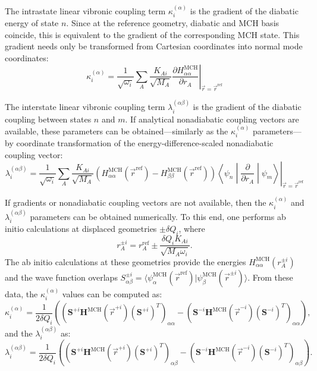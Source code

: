 \documentclass[a4paper,10pt,DIV=15,openany]{scrbook}
\begin{document}
The intrastate linear vibronic coupling term $\kappa_i^{(\alpha)}$ is the gradient of the diabatic energy of state $n$.
Since at the reference geometry, diabatic and MCH basis coincide, this is equivalent to the gradient of the corresponding MCH state.
This gradient needs only be transformed from Cartesian coordinates into normal mode coordinates:
\begin{equation}
  \kappa_i^{(\alpha)} = \frac{1}{\sqrt{\omega_i}}\sum_A \frac{K_{A i}}{\sqrt{M_A}} \left.\frac{\partial H^\text{MCH}_{\alpha\alpha}}{\partial r_A}\right|_{\vec{r}=\vec{r}^\text{ref}}
\end{equation}

The interstate linear vibronic coupling term $\lambda_i^{(\alpha\beta)}$ is the gradient of the diabatic coupling between states $n$ and $m$.
If analytical nonadiabatic coupling vectors are available, these parameters can be obtained---similarly as the $\kappa_i^{(\alpha)}$ parameters---by coordinate transformation of the energy-difference-scaled nonadiabatic coupling vector:
\begin{equation}
  \lambda_i^{(\alpha\beta)}
  =
  \frac{1}{\sqrt{\omega_i}}\sum_A \frac{K_{A i}}{\sqrt{M_A}} 
  \left(H^\text{MCH}_{\alpha\alpha}(\vec{r}^\text{ref})-H^\text{MCH}_{\beta\beta}(\vec{r}^\text{ref})\right)
  \left.
    \left\langle
      \psi_n\middle|\frac{\partial}{\partial r_A}\middle|\psi_m
    \right\rangle
  \right|_{\vec{r}=\vec{r}^\text{ref}}
\end{equation}

If gradients or nonadiabatic coupling vectors are not available, then the $\kappa_i^{(\alpha)}$ and  $\lambda_i^{(\alpha\beta)}$ parameters can be obtained numerically.
To this end, one performs ab initio calculations at displaced geometries $\pm\delta Q_i$, where
\begin{equation}
  r_A^{\pm i}=r_A^\text{ref} \pm \frac{\delta Q_i K_{A i}}{\sqrt{M_A\omega_i}}.
\end{equation}
The ab initio calculations at these geometries provide the energies $H^\text{MCH}_{\alpha\alpha}(r_A^{\pm i})$ and the wave function overlaps $S^{\pm i}_{\alpha\beta}=\langle\psi^\text{MCH}_\alpha(\vec{r}^\text{ref})|\psi^\text{MCH}_\beta(\vec{r}^{\pm i})\rangle$.
From these data, the $\kappa_i^{(\alpha)}$ values can be computed as:
\begin{equation}
  \kappa_i^{(\alpha)}
  =
  \frac{1}{2\delta Q_i}
  \left(
  (\mathbf{S}^{+i}\mathbf{H}^\text{MCH}(\vec{r}^{+i})(\mathbf{S}^{+i})^T)_{\alpha\alpha}
  -
  (\mathbf{S}^{-i}\mathbf{H}^\text{MCH}(\vec{r}^{-i})(\mathbf{S}^{-i})^T)_{\alpha\alpha}
  \right),
\end{equation}
and the $\lambda_i^{(\alpha\beta)}$ as:
\begin{equation}
  \lambda_i^{(\alpha\beta)}
  =
  \frac{1}{2\delta Q_i}
  \left(
  (\mathbf{S}^{+i}\mathbf{H}^\text{MCH}(\vec{r}^{+i})(\mathbf{S}^{+i})^T)_{\alpha\beta}
  -
  (\mathbf{S}^{-i}\mathbf{H}^\text{MCH}(\vec{r}^{-i})(\mathbf{S}^{-i})^T)_{\alpha\beta}
  \right).
\end{equation}
\end{document}
